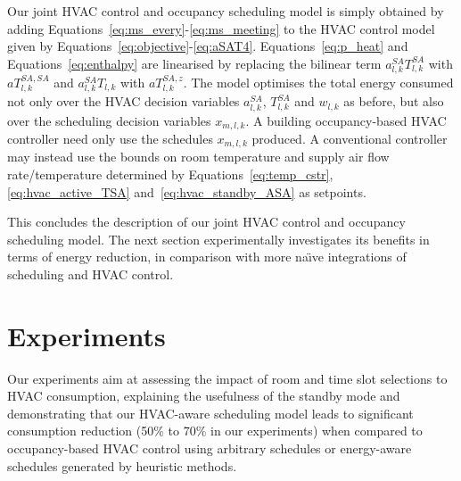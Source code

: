 Our joint HVAC control and occupancy scheduling model is simply obtained by adding Equations~\eqref{eq:ms_every}-\eqref{eq:ms_meeting} to the HVAC control model given by Equations~\eqref{eq:objective}-\eqref{eq:aSAT4}. Equations~\eqref{eq:p_heat} and Equations~\eqref{eq:enthalpy} are linearised by replacing the bilinear term $a^{SA}_{l,k}T^{SA}_{l,k}$ with $aT^{SA,SA}_{l,k}$ and $a^{SA}_{l,k}T_{l,k}$ with $aT^{SA,z}_{l,k}$.  The model optimises the total energy consumed not only over the HVAC decision variables $a^{SA}_{l,k}$, $T^{SA}_{l,k}$ and $w_{l,k}$ as before, but also over the scheduling decision variables $x_{m,l,k}$. A building occupancy-based HVAC controller need only use the schedules $x_{m,l,k}$ produced. A conventional controller may instead use the bounds on room temperature and supply air flow rate/temperature determined by Equations~\eqref{eq:temp_cstr}, \eqref{eq:hvac_active_TSA} and~\eqref{eq:hvac_standby_ASA} as setpoints. 

This concludes the description of our joint HVAC control and occupancy scheduling model. The next section experimentally investigates its
benefits in terms of energy reduction, in comparison with more na\"{\i}ve integrations of scheduling and HVAC control. 


\section{Experiments}
\label{sec:mip:experiments}

Our experiments aim at assessing the impact of room and time slot selections to HVAC consumption, explaining the usefulness of the standby mode and demonstrating that our HVAC-aware scheduling model leads to significant consumption reduction (50\% to 70\% in our experiments) when compared to occupancy-based HVAC control using arbitrary schedules or energy-aware schedules generated by heuristic methods. 


